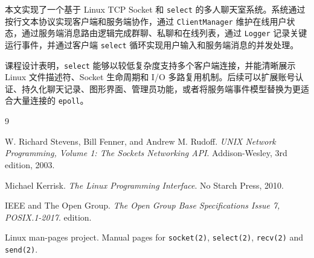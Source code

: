 \documentclass[UTF8,zihao=5,twocolumn]{ctexart}
\newcommand{\code}[1]{\texttt{#1}}
\begin{document}
本文实现了一个基于 Linux TCP Socket 和 \code{select} 的多人聊天室系统。系统通过按行文本协议实现客户端和服务端协作，通过 \code{ClientManager} 维护在线用户状态，通过服务端消息路由逻辑完成群聊、私聊和在线列表，通过 \code{Logger} 记录关键运行事件，并通过客户端 \code{select} 循环实现用户输入和服务端消息的并发处理。

课程设计表明，\code{select} 能够以较低复杂度支持多个客户端连接，并能清晰展示 Linux 文件描述符、Socket 生命周期和 I/O 多路复用机制。后续可以扩展账号认证、持久化聊天记录、图形界面、管理员功能，或者将服务端事件模型替换为更适合大量连接的 \code{epoll}。

\begin{thebibliography}{9}

W. Richard Stevens, Bill Fenner, and Andrew M. Rudoff.
\newblock \emph{UNIX Network Programming, Volume 1: The Sockets Networking API}.
\newblock Addison-Wesley, 3rd edition, 2003.

Michael Kerrisk.
\newblock \emph{The Linux Programming Interface}.
\newblock No Starch Press, 2010.

IEEE and The Open Group.
\newblock \emph{The Open Group Base Specifications Issue 7, POSIX.1-2017}.
 edition.

Linux man-pages project.
\newblock Manual pages for \code{socket(2)}, \code{select(2)}, \code{recv(2)} and \code{send(2)}.

\end{thebibliography}
\end{document}
